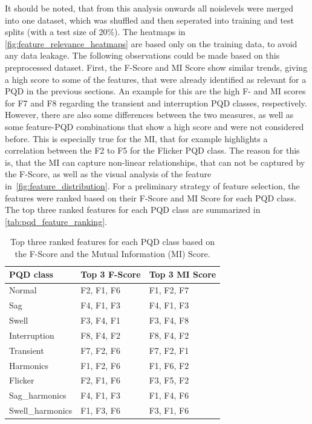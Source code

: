 It should be noted, that from this analysis onwards all noislevels were merged into one dataset, which was shuffled and then seperated into training and test splits (with a test size of 20\%). The heatmaps in \autoref{fig:feature_relevance_heatmaps} are based only on the training data, to avoid any data leakage. The following observations could be made based on this preprocessed dataset. First, the F-Score and MI Score show similar trends, giving a high score to some of the features, that were already identified as relevant for a PQD in the previous sections. An example for this are the high F- and MI scores for F7 and F8 regarding the transient and interruption PQD classes, respectively. However, there are also some differences between the two measures, as well as some feature-PQD combinations that show a high score and were not considered before. This is especially true for the MI, that for example highlights a correlation between the F2 to F5 for the Flicker PQD class. The reason for this is, that the MI can capture non-linear relationships, that can not be captured by the F-Score, as well as the visual analysis of the feature in~\autoref{fig:feature_distribution}. For a preliminary strategy of feature selection, the features were ranked based on their F-Score and MI Score for each PQD class. The top three ranked features for each PQD class are summarized in \autoref{tab:pqd_feature_ranking}.
\begin{table}[htbp]
\caption{Top three ranked features for each PQD class based on the F-Score and the Mutual Information (MI) Score.}
\label{tab:pqd_feature_ranking}
\centering
\begin{tabularx}{\columnwidth}{l X X}
\hline
\hline
\textbf{PQD class} & \textbf{Top 3 F-Score} & \textbf{Top 3 MI Score} \\
\hline
Normal           & F2, F1, F6 & F1, F2, F7 \\
Sag              & F4, F1, F3 & F4, F1, F3 \\
Swell            & F3, F4, F1 & F3, F4, F8 \\
Interruption     & F8, F4, F2 & F8, F4, F2 \\
Transient        & F7, F2, F6 & F7, F2, F1 \\
Harmonics        & F1, F2, F6 & F1, F6, F2 \\
Flicker          & F2, F1, F6 & F3, F5, F2 \\
Sag\_harmonics   & F4, F1, F3 & F1, F4, F6 \\
Swell\_harmonics & F1, F3, F6 & F3, F1, F6 \\
\hline
\hline
\end{tabularx}
\end{table}

